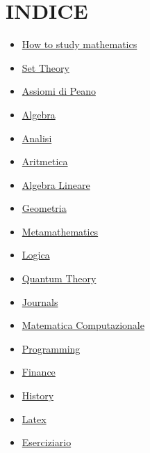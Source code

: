 \documentclass[a4paper,10pt]{article}
\begin{document}
\section{INDICE}
\begin{itemize}
  \item \href{HowToStudy.html}{How to study mathematics}
  \item \href{SetTheory.html}{Set Theory}
  \item \href{AssiomiPeano.html}{Assiomi di Peano}
  \item \href{AlgebraIndex.html}{Algebra} 
  \item \href{Analisi.html}{Analisi} 
  \item \href{Aritmetica.html}{Aritmetica}
  \item \href{AlgebraLineare.html}{Algebra Lineare}
  \item \href{Geometria.html}{Geometria}
  \item \href{Metamathematics.html}{Metamathematics}
  \item \href{Logics.html}{Logica}
  \item \href{QuantumTheory.html}{Quantum Theory}
  \item \href{Journals.html}{Journals}
  \item \href{MatematicaComputazionale.html}{Matematica Computazionale}
  \item \href{Programming.html}{Programming}
  \item \href{finance.html}{Finance} 
  \item \href{history.html}{History} 
  \item \href{latex.html}{Latex} 
  \item \href{Eserciziario.html}{Eserciziario}
  
\end{itemize}
\end{document}
